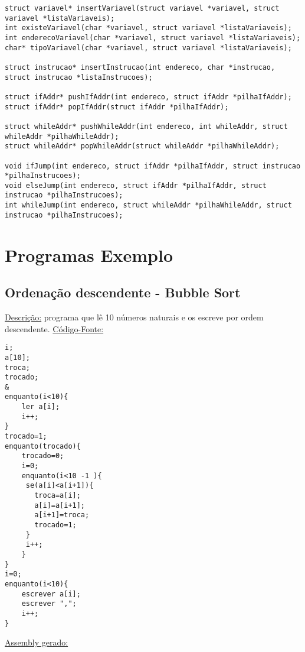 \documentclass{report}
\begin{document}
\begin{verbatim}
struct variavel* insertVariavel(struct variavel *variavel, struct variavel *listaVariaveis);
int existeVariavel(char *variavel, struct variavel *listaVariaveis);
int enderecoVariavel(char *variavel, struct variavel *listaVariaveis);
char* tipoVariavel(char *variavel, struct variavel *listaVariaveis);
 
struct instrucao* insertInstrucao(int endereco, char *instrucao, struct instrucao *listaInstrucoes);
 
struct ifAddr* pushIfAddr(int endereco, struct ifAddr *pilhaIfAddr);
struct ifAddr* popIfAddr(struct ifAddr *pilhaIfAddr);
 
struct whileAddr* pushWhileAddr(int endereco, int whileAddr, struct whileAddr *pilhaWhileAddr);
struct whileAddr* popWhileAddr(struct whileAddr *pilhaWhileAddr);
 
void ifJump(int endereco, struct ifAddr *pilhaIfAddr, struct instrucao *pilhaInstrucoes);
void elseJump(int endereco, struct ifAddr *pilhaIfAddr, struct instrucao *pilhaInstrucoes);
int whileJump(int endereco, struct whileAddr *pilhaWhileAddr, struct instrucao *pilhaInstrucoes);
\end{verbatim}

\chapter{Programas Exemplo} \label{ae}

\section{Ordenação descendente - Bubble Sort}

\underline{Descrição:} programa que lê 10 números naturais e os escreve por ordem descendente.
\newline
\newline
\underline{Código-Fonte:}

\begin{verbatim}
i;
a[10];    
troca;    
trocado;  
&
enquanto(i<10){
    ler a[i];
    i++;
}
trocado=1;
enquanto(trocado){
    trocado=0;
    i=0;
    enquanto(i<10 -1 ){
     se(a[i]<a[i+1]){
       troca=a[i];
       a[i]=a[i+1];
       a[i+1]=troca;
       trocado=1;
     }
     i++;
    }
}
i=0;
enquanto(i<10){
    escrever a[i];
    escrever ",";
    i++;
}
\end{verbatim}

\underline{Assembly gerado:}
\end{document}
